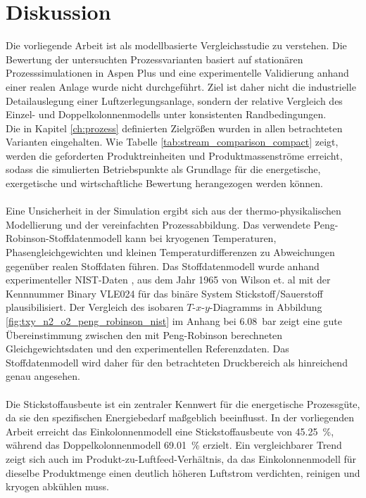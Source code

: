 \chapter{Diskussion}
\label{ch:diskussion}

Die vorliegende Arbeit ist als modellbasierte Vergleichsstudie zu verstehen. Die Bewertung der untersuchten Prozessvarianten basiert auf stationären Prozesssimulationen in Aspen Plus und eine experimentelle Validierung anhand einer
realen Anlage wurde nicht durchgeführt. Ziel ist daher nicht die industrielle Detailauslegung einer Luftzerlegungsanlage, sondern der relative Vergleich des Einzel- und Doppelkolonnenmodells unter konsistenten Randbedingungen.\\
Die in Kapitel \ref{ch:prozess} definierten Zielgrößen wurden in allen betrachteten Varianten eingehalten. Wie Tabelle \ref{tab:stream_comparison_compact} zeigt, werden die geforderten Produktreinheiten und Produktmassenströme erreicht, sodass die simulierten Betriebspunkte als Grundlage für die energetische, exergetische und wirtschaftliche Bewertung
herangezogen werden können.\\
\\
Eine Unsicherheit in der Simulation ergibt sich aus der thermo-physikalischen Modellierung und der vereinfachten Prozessabbildung. Das verwendete Peng-Robinson-Stoffdatenmodell kann bei kryogenen Temperaturen, Phasengleichgewichten und kleinen Temperaturdifferenzen zu Abweichungen gegenüber realen Stoffdaten führen. Das Stoffdatenmodell wurde anhand
experimenteller NIST-Daten \cite{nationalinstituteofstandardsandtechnologyNISTChemistryWebBook2026}, aus dem Jahr 1965 von Wilson et. al \cite{wilsonArgonOxygenNitrogen1965} mit der Kennnummer Binary VLE024 für das binäre System Stickstoff/Sauerstoff
plausibilisiert. Der Vergleich des isobaren \(T\)-\(x\)-\(y\)-Diagramms in Abbildung \ref{fig:txy_n2_o2_peng_robinson_nist} im Anhang bei \SI{6.08}{bar} zeigt eine gute Übereinstimmung zwischen den mit Peng-Robinson berechneten Gleichgewichtsdaten und den experimentellen Referenzdaten. Das Stoffdatenmodell wird daher für den betrachteten Druckbereich als hinreichend genau angesehen.\\
\\
Die Stickstoffausbeute ist ein zentraler Kennwert für die energetische Prozessgüte, da sie den spezifischen Energiebedarf maßgeblich beeinflusst. In der vorliegenden Arbeit erreicht das Einkolonnenmodell eine Stickstoffausbeute von \SI{45,25}{\percent}, während das Doppelkolonnenmodell \SI{69,01}{\percent} erzielt. Ein vergleichbarer Trend zeigt sich auch im Produkt-zu-Luftfeed-Verhältnis, da das Einkolonnenmodell für dieselbe Produktmenge einen deutlich höheren Luftstrom verdichten, reinigen und kryogen abkühlen muss. \\
